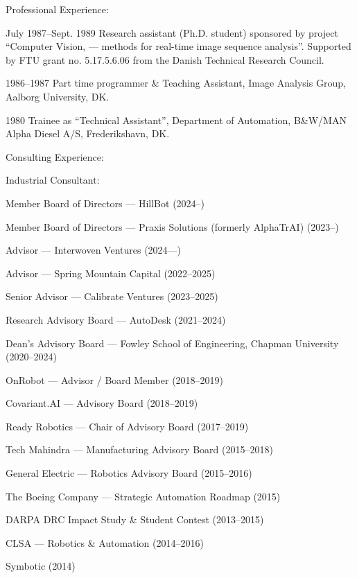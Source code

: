\documentclass{article}
\newenvironment{sublist}{%
  \begin{list}{}{%
      \setlength{\itemsep}{0em}\setlength{\parsep}{0em}%
      \setlength{\topsep}{0em}\setlength{\parskip}{0em}%
    }%
}%
{ \end{list} }
\begin{document}
\begin{cv}
\begin{cvlist}{Professional Experience:}
		\item[July 1987--Sept. 1989] Research assistant (Ph.D. student) sponsored
		by project ``Computer Vision, --- methods for real-time image
		sequence analysis''. Supported by FTU grant no. 5.17.5.6.06 from the
		Danish Technical Research Council.

		\item[1986--1987] Part time programmer \& Teaching Assistant,
		Image Analysis Group, Aalborg University, DK.\@

		\item[1980] Trainee as ``Technical Assistant'', Department of
		Automation, B\&W/MAN Alpha Diesel A/S, Frederikshavn, DK.\@
	\end{cvlist}

	\begin{cvlist}{Consulting Experience:}
		\item Industrial Consultant:
		\begin{sublist}
			\item Member Board of Directors --- HillBot (2024--)
			\item Member Board of Directors --- Praxis Solutions (formerly AlphaTrAI) (2023--)
			\item Advisor --- Interwoven Ventures (2024---)
			\item Advisor --- Spring Mountain Capital (2022--2025)
			\item Senior Advisor --- Calibrate Ventures (2023--2025)
			\item Research Advisory Board --- AutoDesk (2021--2024)
			\item Dean's Advisory Board --- Fowley School of Engineering, Chapman University (2020--2024)
			\item OnRobot --- Advisor / Board Member (2018--2019)
			\item Covariant.AI --- Advisory Board (2018--2019)
			\item Ready Robotics --- Chair of Advisory Board (2017--2019)
			\item Tech Mahindra --- Manufacturing Advisory Board (2015--2018)
			\item General Electric --- Robotics Advisory Board (2015--2016)
			\item The Boeing Company --- Strategic Automation Roadmap (2015)
			\item DARPA DRC Impact Study \& Student Contest (2013--2015)
			\item CLSA --- Robotics \& Automation (2014--2016)
			\item Symbotic (2014)

\end{sublist}
\end{cvlist}
\end{cv}
\end{document}
